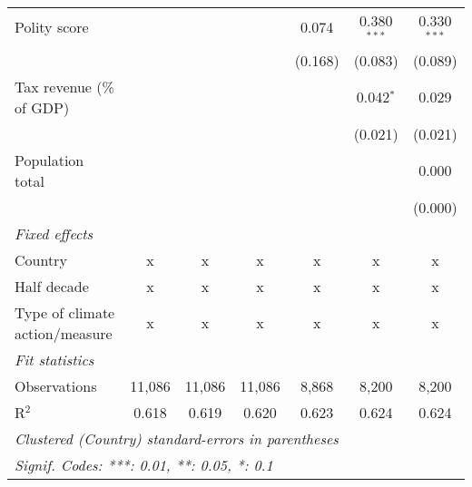 \begin{tabular}{lcccccc}
   Polity score                                              &         &               &                & 0.074          & 0.380$^{***}$  & 0.330$^{***}$\\   
                                                             &         &               &                & (0.168)        & (0.083)        & (0.089)\\   
   Tax revenue (\% of GDP)                                   &         &               &                &                & 0.042$^{*}$    & 0.029\\   
                                                             &         &               &                &                & (0.021)        & (0.021)\\   
   Population total                                          &         &               &                &                &                & 0.000\\   
                                                             &         &               &                &                &                & (0.000)\\   
   \emph{Fixed effects}\\
   Country                                                   & x       & x             & x              & x              & x              & x\\  
   Half decade                                               & x       & x             & x              & x              & x              & x\\  
   Type of climate action/measure                            & x       & x             & x              & x              & x              & x\\  
   \midrule \emph{Fit statistics}\\
   Observations                                              & 11,086  & 11,086        & 11,086         & 8,868          & 8,200          & 8,200\\  
   R$^2$                                                     & 0.618   & 0.619         & 0.620          & 0.623          & 0.624          & 0.624\\  
   \midrule
   \multicolumn{7}{l}{\emph{Clustered (Country) standard-errors in parentheses}}\\
   \multicolumn{7}{l}{\emph{Signif. Codes: ***: 0.01, **: 0.05, *: 0.1}}\\
\end{tabular}
\par\endgroup


